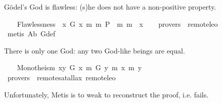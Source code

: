 %
\begin{isabellebody}%
\def\isabellecontext{GoedelGodExtensions}%
%
\isadelimtheory
%
\endisadelimtheory
%
\isatagtheory
%
\endisatagtheory
{\isafoldtheory}%
%
\isadelimtheory
%
\endisadelimtheory
%
\isamarkuptrue%
%
\begin{isamarkuptext}%
G\"odel's God is flawless: (s)he does not have a non-positive property.%
\end{isamarkuptext}%
\isamarkuptrue%
\ \ \isamarkupfalse%
\ Flawlessness{\isacharcolon}\ {\isachardoublequoteopen}{\isacharbrackleft}{\isasymforall}{\isacharparenleft}{\isasymlambda}{\isasymPhi}{\isachardot}\ {\isasymforall}{\isacharparenleft}{\isasymlambda}x{\isachardot}\ {\isacharparenleft}G\ x\ m{\isasymrightarrow}\ {\isacharparenleft}m{\isasymnot}\ {\isacharparenleft}P\ {\isasymPhi}{\isacharparenright}\ m{\isasymrightarrow}\ m{\isasymnot}\ {\isacharparenleft}{\isasymPhi}\ x{\isacharparenright}{\isacharparenright}{\isacharparenright}{\isacharparenright}{\isacharparenright}{\isacharbrackright}{\isachardoublequoteclose}\isanewline
\ \ \isamarkupfalse%
\ {\isacharbrackleft}provers\ {\isacharequal}\ remote{\isacharunderscore}leo{}{\isacharbrackright}\ \isanewline
%
\isadelimproof
\ \ %
\endisadelimproof
%
\isatagproof
{}\isamarkupfalse%
\ {\isacharparenleft}metis\ A{}b\ G{\isacharunderscore}def{\isacharparenright}%
\endisatagproof
{\isafoldproof}%
%
\isadelimproof
%
\endisadelimproof
%
\begin{isamarkuptext}%
There is only one God: any two God-like beings are equal.%
\end{isamarkuptext}%
\isamarkuptrue%
\ \ \isamarkupfalse%
\ Monotheism{\isacharcolon}\ {\isachardoublequoteopen}{\isacharbrackleft}{\isasymforall}{\isacharparenleft}{\isasymlambda}x{\isachardot}{\isasymforall}{\isacharparenleft}{\isasymlambda}y{\isachardot}\ {\isacharparenleft}G\ x\ m{\isasymrightarrow}\ {\isacharparenleft}G\ y\ m{\isasymrightarrow}\ {\isacharparenleft}x\ m{\isacharequal}\ y{\isacharparenright}{\isacharparenright}{\isacharparenright}{\isacharparenright}{\isacharparenright}{\isacharbrackright}{\isachardoublequoteclose}\isanewline
\ \ \isamarkupfalse%
\ {\isacharbrackleft}provers\ {\isacharequal}\ remote{\isacharunderscore}satallax\ remote{\isacharunderscore}leo{}{\isacharbrackright}%
\isadelimproof
\ %
\endisadelimproof
%
\isatagproof
{}\isamarkupfalse%
%
\endisatagproof
{\isafoldproof}%
%
\isadelimproof
%
\endisadelimproof
%
\begin{isamarkuptext}%
Unfortunately, Metis is to weak to reconstruct the proof, i.e.  fails.%
\end{isamarkuptext}%
\isamarkuptrue%
%
\isadelimtheory
%
\endisadelimtheory
%
\isatagtheory
%
\endisatagtheory
{\isafoldtheory}%
%
\isadelimtheory
%
\endisadelimtheory
\ \end{isabellebody}%
